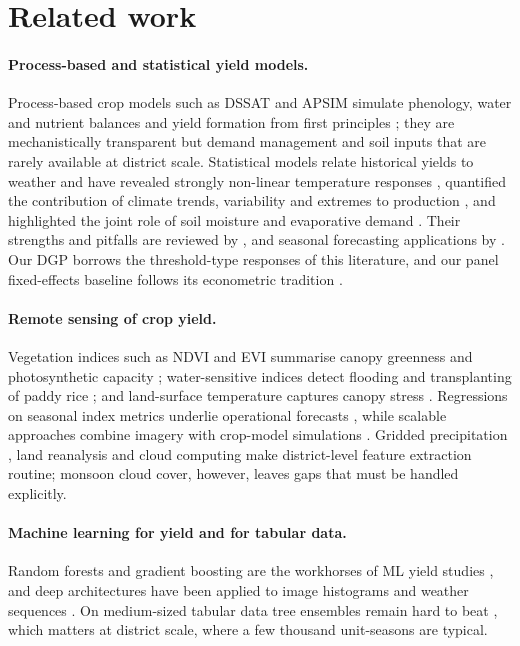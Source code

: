 \section{Related work}\label{sec:related}

\paragraph{Process-based and statistical yield models.}
Process-based crop models such as DSSAT and APSIM simulate phenology, water and nutrient balances and yield formation from first principles \citep{jones2003dssat,holzworth2014apsim}; they are mechanistically transparent but demand management and soil inputs that are rarely available at district scale. Statistical models relate historical yields to weather and have revealed strongly non-linear temperature responses \citep{schlenker2009nonlinear}, quantified the contribution of climate trends, variability and extremes to production \citep{lobell2011climate,ray2015climate,lesk2016influence}, and highlighted the joint role of soil moisture and evaporative demand \citep{rigden2020combined}. Their strengths and pitfalls are reviewed by \citet{lobell2010use}, and seasonal forecasting applications by \citet{basso2019seasonal}. Our DGP borrows the threshold-type responses of this literature, and our panel fixed-effects baseline follows its econometric tradition \citep{wooldridge2010econometric}.

\paragraph{Remote sensing of crop yield.}
Vegetation indices such as NDVI and EVI summarise canopy greenness and photosynthetic capacity \citep{tucker1979red,huete2002overview}; water-sensitive indices detect flooding and transplanting of paddy rice \citep{gao1996ndwi,xiao2005mapping}; and land-surface temperature captures canopy stress \citep{wan2008new}. Regressions on seasonal index metrics underlie operational forecasts \citep{becker2010generalized,johnson2014assessment}, while scalable approaches combine imagery with crop-model simulations \citep{lobell2015scalable,burke2017satellite}. Gridded precipitation \citep{funk2015climate}, land reanalysis \citep{munozsabater2021era5} and cloud computing \citep{gorelick2017google} make district-level feature extraction routine; monsoon cloud cover, however, leaves gaps that must be handled explicitly.

\paragraph{Machine learning for yield and for tabular data.}
Random forests \citep{breiman2001random} and gradient boosting \citep{friedman2001greedy,ke2017lightgbm} are the workhorses of ML yield studies \citep{jeong2016random,cai2019integrating,vanklompenburg2020crop}, and deep architectures have been applied to image histograms and weather sequences \citep{you2017deep,khaki2019crop}. On medium-sized tabular data tree ensembles remain hard to beat \citep{grinsztajn2022why,shwartz2022tabular}, which matters at district scale, where a few thousand unit-seasons are typical.

